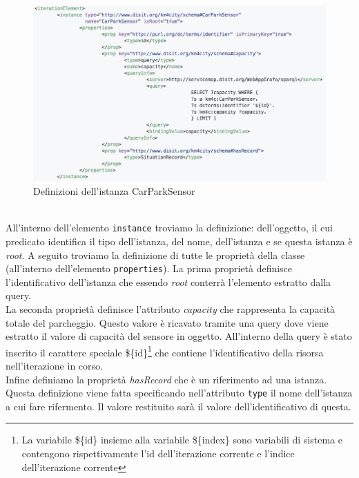 \documentclass[12pt,a4paper,italian]{article}
\begin{document}
\begin{figure}[h!]
	\centering
	\includegraphics[width=14cm]{img/esempio_p2.png}
	\caption{Definizioni dell'istanza CarParkSensor}\label{esempio2}
\end{figure}
\\All'interno dell'elemento \texttt{instance} troviamo la definizione: dell'oggetto, il cui predicato identifica il tipo dell'istanza, del nome, dell'istanza e se questa istanza è \emph{root}.
A seguito troviamo la definizione di tutte le proprietà della classe (all'interno dell'elemento \texttt{properties}).
La prima proprietà definisce l'identificativo dell'istanza che essendo \emph{root} conterrà l'elemento estratto dalla query.\\
La seconda proprietà definisce l'attributo \emph{capacity} che rappresenta la capacità totale del parcheggio. Questo valore è ricavato tramite una query dove viene estratto il valore di capacità del sensore in oggetto. All'interno della query è stato inserito il carattere speciale \$\{id\}\footnote{La variabile \$\{id\}  insieme alla variabile \$\{index\} sono variabili di sistema e contengono rispettivamente l'id dell'iterazione corrente e l'indice dell'iterazione corrente} che contiene l'identificativo della risorsa nell'iterazione in corso.\\
Infine definiamo la proprietà \emph{hasRecord} che è un riferimento ad una istanza. Questa definizione viene fatta specificando nell'attributo \texttt{type} il nome dell'istanza a cui fare rifermento. Il valore restituito sarà il valore dell'identificativo di questa.
\newpage
\end{document}
